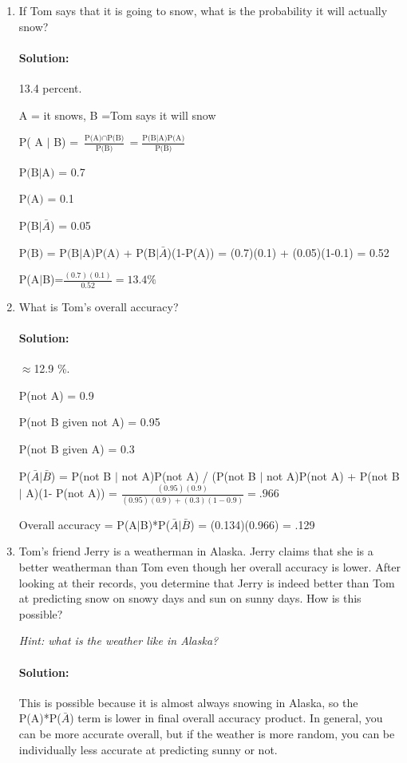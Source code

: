 \documentclass[11pt, notitlepage]{article}
\newenvironment{solution}{\paragraph{Solution:}}{\hfill}
\begin{document}
\begin{enumerate}[label=(\alph*)]

\item If Tom says that it is going to snow, what is the probability it will actually snow?
\begin{solution} 13.4 percent.

A = it snows, B =Tom says it will snow

	P( A $\vert$ B) = $\frac{\text{P(A)} \cap \text{P(B)}}{\text{P(B)}}=\frac{\text{P(B}\vert \text{A)P(A)}} {\text{P(B)}}$
	
	$\text{P(B} \vert \text{A)}$ = 0.7
	
	$\text{P(A)}$ = 0.1
	
	P(B$\vert \bar A$) = 0.05
	
	$\text{P(B)}$ = $\text{P(B} \vert \text{A)}\text{P(A)}$ + P(B$\vert \bar A$)(1-P(A)) = (0.7)(0.1) + (0.05)(1-0.1) = 0.52
	
	P(A$\vert$B)=$\frac{(0.7)(0.1)}{0.52}=13.4\%$
\end{solution}

\item What is Tom's overall accuracy?
\begin{solution}$\approx$12.9 \%.

P(not A) = 0.9

P(not B given not A) = 0.95

P(not B given A) = 0.3

P($\bar A | \bar B$) = P(not B $|$ not A)P(not A) / (P(not B $|$ not A)P(not A) + P(not B $|$ A)(1- P(not A)) = $\frac{(0.95)(0.9)}{(0.95)(0.9)+(0.3)(1-0.9)}=.966$

Overall accuracy = P(A$|$B)*P($\bar A | \bar B$) = (0.134)(0.966) = .129

\end{solution}
\item Tom's friend Jerry is a weatherman in Alaska. Jerry claims that she is a better weatherman than Tom even though her overall accuracy is lower. After looking at their records, you determine that Jerry is indeed better than Tom at predicting snow on snowy days and sun on sunny days. How is this possible? 

\textit{Hint: what is the weather like in Alaska?}
\begin{solution}
	This is possible because it is almost always snowing in Alaska, so the P(A)*P($\bar A$) term is lower in final overall accuracy product. In general, you can be more accurate overall, but if the weather is more random, you can be individually less accurate at predicting sunny or not.
\end{solution}
\end{enumerate}
\end{document}
